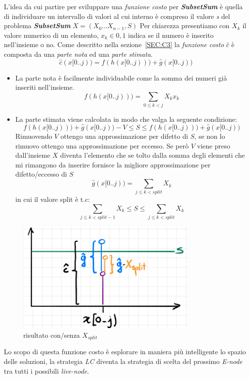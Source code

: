 \documentclass[a4paper]{article}
\newcommand{\imp}[1]{\textbf{\textit{#1}}}
\begin{document}
L'idea da cui partire per sviluppare una \textit{funzione costo} per \imp{SubsetSum} è quella di individuare un intervallo di valori al cui interno è compreso il valore \emph{s} del problema \imp{SubsetSum} $X =({X_0 ... X_{n-1}},S)$ 
Per chiarezza presentiamo con $X_k$ il valore numerico di un elemento, $x_k \in {0,1}$ indica se il numero è inserito nell'insieme o no.
Come descritto nella sezione~\ref{SEC:C3} la \textit{funzione costo} $\hat c$ è composta da una \textit{parte nota} ed una \textit{parte stimata}.
$$\hat c(x[0..j)) = f(h(x[0..j))) + \hat g(x[0..j))$$
\begin{itemize}
	\item La parte nota è facilmente individuabile come la somma dei numeri già inseriti nell'insieme.$$ f(h(x[0..j)))=\sum_{0 \leq k < j} X_kx_k$$
	\item La parte stimata viene calcolata in modo che valga la seguente condizione:
		$$ f(h(x[0..j))) + \hat g(x[0..j)) - V \leq S \leq f(h(x[0..j))) + \hat g(x[0..j)) $$
	Rimuovendo $V$ ottengo una approssimazione per difetto di $S$, se non lo rimuovo ottengo una approssimazione per eccesso.
	Se però $V$ viene preso dall'insieme $X$ diventa l'elemento che se tolto dalla somma degli elementi che mi rimangono da inserire fornisce la migliore approssimazione per difetto/eccesso di $S$
	$$ \hat g(x[0..j))=\sum_{j \leq k < split} X_k$$ in cui il valore split è t.c:
	$$\sum_{j \leq k < split-1} X_k \leq S \leq \sum_{j \leq k < split} X_k$$
\end{itemize}
\begin{figure}[!ht]
\centering
\includegraphics[width=0.8\textwidth]{./img/C6.png}
\caption{risultato con/senza $X_{split}$} \label{FIG:C6}
\end{figure}
Lo scopo di questa funzione costo è esplorare in maniera più intelligente lo spazio delle soluzioni, la strategia \textit{LC} diventa la strategia di scelta del prossimo \textit{E-node} tra tutti i possibili \textit{live-node}.
\end{document}
